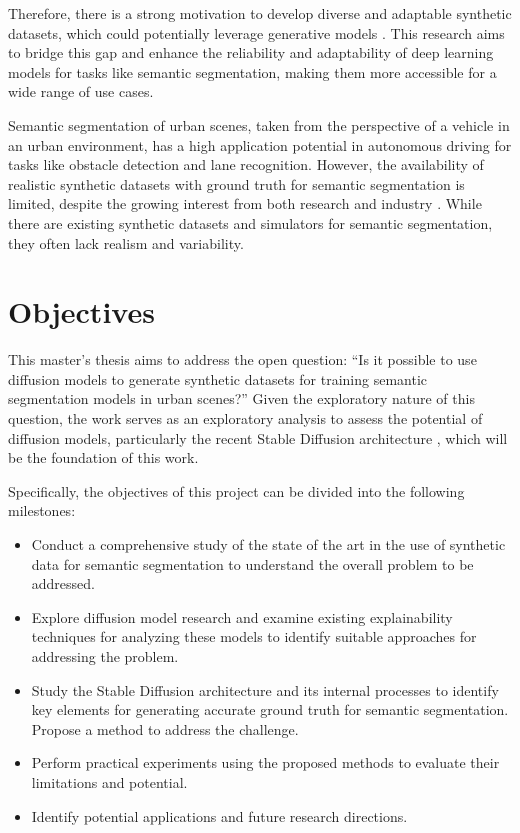 Therefore, there is a strong motivation to develop diverse and adaptable synthetic datasets, which could potentially leverage generative models \cite{DAAM}. This research aims to bridge this gap and enhance the reliability and adaptability of deep learning models for tasks like semantic segmentation, making them more accessible for a wide range of use cases.

Semantic segmentation of urban scenes, taken from the perspective of a vehicle in an urban environment, has a high application potential in autonomous driving for tasks like obstacle detection and lane recognition. However, the availability of realistic synthetic datasets with ground truth for semantic segmentation is limited, despite the growing interest from both research and industry \cite{Geyer2020A2D2AA}. While there are existing synthetic datasets and simulators for semantic segmentation, they often lack realism and variability.



\section{Objectives}

This master's thesis aims to address the open question: ``Is it possible to use diffusion models to generate synthetic datasets for training semantic segmentation models in urban scenes?'' Given the exploratory nature of this question, the work serves as an exploratory analysis to assess the potential of diffusion models, particularly the recent Stable Diffusion architecture \cite{rombach2022high}, which will be the foundation of this work.

Specifically, the objectives of this project can be divided into the following milestones:

\begin{itemize}
\item Conduct a comprehensive study of the state of the art in the use of synthetic data for semantic segmentation to understand the overall problem to be addressed.
\item Explore diffusion model research and examine existing explainability techniques for analyzing these models to identify suitable approaches for addressing the problem.
\item Study the Stable Diffusion architecture and its internal processes to identify key elements for generating accurate ground truth for semantic segmentation. Propose a method to address the challenge.
\item Perform practical experiments using the proposed methods to evaluate their limitations and potential.
\item Identify potential applications and future research directions.
\end{itemize}

